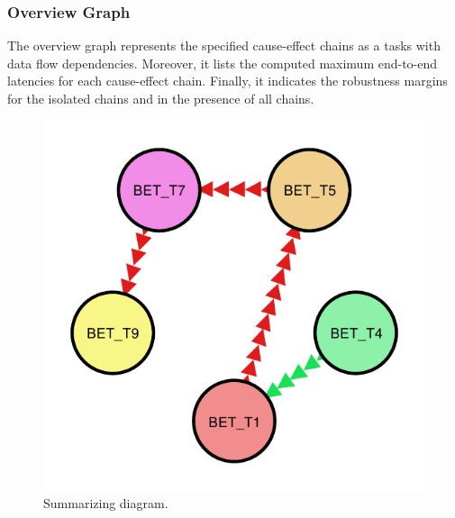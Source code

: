 \subsubsection{Overview Graph}
The overview graph represents the specified cause-effect chains as a tasks with data flow dependencies.
Moreover, it lists the computed maximum end-to-end latencies for each cause-effect chain.
Finally, it indicates the robustness margins for the isolated chains and in the presence of all chains.
%
\begin{figure}[H]
  \centering
  \includegraphics[width=400pt]{fig/results.pdf}
  \caption{Summarizing diagram.}
  \label{fig:summ_diagram}
\end{figure}



\newpage
